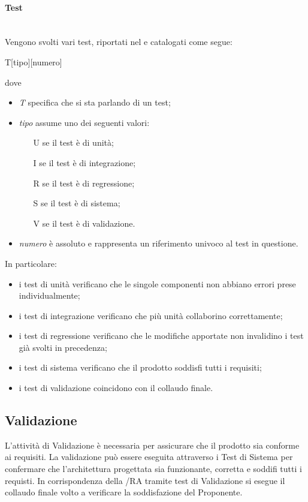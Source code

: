\paragraph{Test}\mbox{}\\
Vengono svolti vari test, riportati nel \PianoDiQualifica{} e catalogati come segue:
\begin{center}
	T[tipo][numero]
\end{center}
dove
\begin{itemize}
	\item \textit{T} specifica che si sta parlando di un test;
	\item \textit{tipo} assume uno dei seguenti valori:
	\begin{itemize}
		\item [U] se il test è di unità;
		\item [I] se il test è di integrazione;
		\item [R] se il test è di regressione;
		\item [S] se il test è di sistema;
		\item [V] se il test è di validazione.
	\end{itemize}
	\item \textit{numero} è assoluto e rappresenta un riferimento univoco al test in questione.
\end{itemize}
In particolare:
\begin{itemize}
	\item i test di unità verificano che le singole componenti non abbiano errori prese individualmente;
	\item i test di integrazione verificano che più unità collaborino correttamente;
	\item i test di regressione verificano che le modifiche apportate non invalidino i test già svolti in precedenza;
	\item i test di sistema verificano che il prodotto soddisfi tutti i requisiti;
	\item i test di validazione coincidono con il collaudo finale.
\end{itemize}

\subsection{Validazione}
L’attività di Validazione è necessaria per assicurare che il prodotto sia conforme ai requisiti.
La validazione può essere eseguita attraverso i Test di Sistema per confermare che l'architettura progettata sia funzionante, corretta e soddifi tutti i requisti. 
In corrispondenza della /RA tramite test di Validazione si esegue il collaudo finale volto a verificare la soddisfazione del Proponente.


